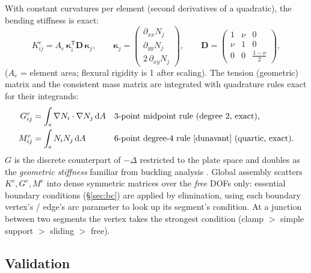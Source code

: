 \documentclass[11pt,a4paper]{article}
\newcommand{\lap}{\Delta}
\newcommand{\dd}{\mathrm{d}}
\begin{document}
With constant curvatures per element (second derivatives of a quadratic),
the bending stiffness is exact:
%
\begin{equation}
  K^e_{ij} = A_e\, \bm\kappa_i^{\mathsf T} \mathbf{D}\, \bm\kappa_j,
  \qquad
  \bm\kappa_j = \begin{pmatrix} \partial_{xx} N_j \\ \partial_{yy} N_j \\
                 2\,\partial_{xy} N_j \end{pmatrix},
  \qquad
  \mathbf{D} = \begin{pmatrix} 1 & \nu & 0\\ \nu & 1 & 0\\
               0 & 0 & \tfrac{1-\nu}{2}\end{pmatrix},
\end{equation}
%
($A_e$ = element area; flexural rigidity is 1 after scaling). The tension
(geometric) matrix and the consistent mass matrix are integrated with
quadrature rules exact for their integrands:
%
\begin{align}
  G^e_{ij} &= \int_{e} \nabla N_i \cdot \nabla N_j \,\dd A
  &&\text{3-point midpoint rule (degree 2, exact),}\\
  M^e_{ij} &= \int_{e} N_i N_j \,\dd A
  &&\text{6-point degree-4 rule \cite{dunavant} (quartic, exact).}
\end{align}
%
$G$ is the discrete counterpart of $-\lap$ restricted to the plate space and
doubles as the \emph{geometric stiffness} familiar from buckling analysis
\cite{bathe}. Global assembly scatters $K^e, G^e, M^e$ into dense symmetric
matrices over the \emph{free} DOFs only: essential boundary conditions
(\S\ref{sec:bc}) are applied by elimination, using each boundary vertex's /
edge's arc parameter to look up its segment's condition. At a junction
between two segments the vertex takes the strongest condition
(clamp $>$ simple support $>$ sliding $>$ free).

\subsection{Validation}
\label{sec:validation}
\end{document}
